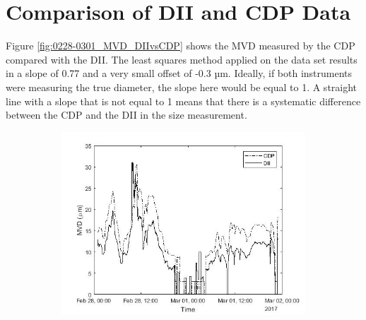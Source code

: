 \section{Comparison of DII and CDP Data}

Figure \ref{fig:0228-0301_MVD_DIIvsCDP} shows the MVD measured by the CDP compared with the DII. The least squares method applied on the data set results in a slope of 0.77 and a very small offset of -0.3 µm. Ideally, if both instruments were measuring the true diameter, the slope here would be equal to 1. A straight line with a slope that is not equal to 1 means that there is a systematic difference between the CDP and the DII in the size measurement.

\begin{figure}[ht]
\centering
\begin{subfigure}{.85\textwidth}
  \centering
  \includegraphics[width=1\linewidth]{figures/0228-0301/30min_mvd_CDP_DII_170228-170301_19212_0LpartDII_214646_0LpartCDP}
  \label{fig:0228-0301_MVDvstime}
\end{subfigure}%


\end{figure}
